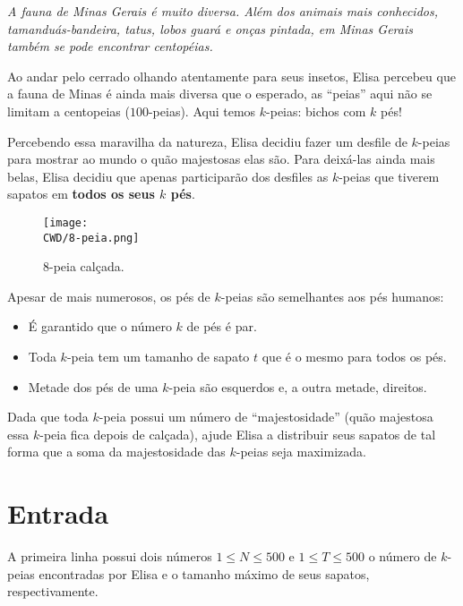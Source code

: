 %

\begin{center}
\textit{
  A fauna de Minas Gerais é muito diversa. Além dos animais mais conhecidos, tamanduás-bandeira, tatus, lobos guará e onças pintada, em Minas Gerais também se pode encontrar centopéias. 
  }
\end{center}
  
  Ao andar pelo cerrado olhando atentamente para seus insetos, Elisa percebeu que a fauna de Minas é ainda mais diversa que o esperado, as ``peias'' aqui não se limitam a centopeias ($100$-peias). Aqui temos $k$-peias: bichos com $k$ pés!
    
  Percebendo essa maravilha da natureza, Elisa decidiu fazer um desfile de $k$-peias para mostrar ao mundo o quão majestosas elas são. Para deixá-las ainda mais belas, Elisa decidiu que apenas participarão dos desfiles as $k$-peias que tiverem sapatos em \textbf{todos os seus $k$ pés}. 
  
  \begin{figure}[H]
    \centering
    \texttt{[image: \\CWD/8-peia.png]}
    \caption{8-peia calçada.}
  \end{figure}

  Apesar de mais numerosos, os pés de $k$-peias são semelhantes aos pés humanos:
\begin{itemize}
  \item É garantido que o número $k$ de pés é par.
  \item Toda $k$-peia tem um tamanho de sapato $t$ que é o mesmo para todos os pés.
  \item Metade dos pés de uma $k$-peia são esquerdos e, a outra metade, direitos.
\end{itemize}

Dada que toda $k$-peia possui um número de ``majestosidade'' (quão majestosa essa $k$-peia fica depois de calçada), ajude Elisa a distribuir seus sapatos de tal forma que a soma da majestosidade das $k$-peias seja maximizada.

%
\section*{Entrada}

A primeira linha possui dois números $1 \leq N \leq 500$ e $1 \leq T \leq 500$ o número de $k$-peias encontradas por Elisa e o tamanho máximo de seus sapatos, respectivamente.

